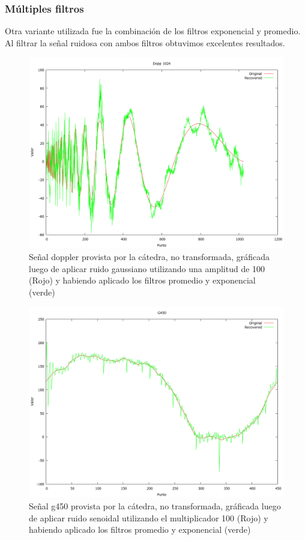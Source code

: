 \subsubsection{M\'ultiples filtros}

Otra variante utilizada fue la combinaci\'on de los filtros exponencial y
promedio. Al filtrar la se\~nal ruidosa con ambos filtros obtuvimos excelentes
resultados.

\begin{figure}
\begin {center}
\includegraphics[width=360pt]{imagenes/dopp1024-gauss100-both.png}
\end {center}
\caption{Se\~nal doppler provista por la c\'atedra, no transformada, gr\'aficada
luego de aplicar ruido gaussiano utilizando una amplitud de 100 (Rojo) y 
habiendo aplicado los filtros promedio y exponencial (verde)}
\label{fig:SinProm}
\end{figure}

\begin{figure}
\begin {center}
\includegraphics[width=360pt]{imagenes/g450-sin100-both.png}
\end {center}
\caption{Se\~nal g450 provista por la c\'atedra, no transformada, gr\'aficada
luego de aplicar ruido senoidal utilizando el multiplicador 100 (Rojo) y 
habiendo aplicado los filtros promedio y exponencial (verde)}
\label{fig:SinProm}
\end{figure}


